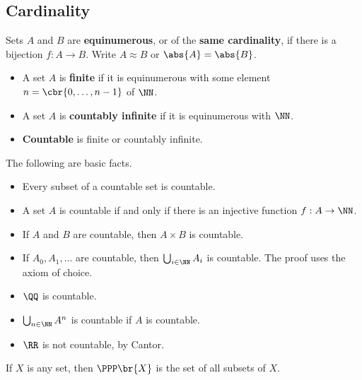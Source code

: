 \subsection{Cardinality}

\begin{definition}
Sets $ A $ and $ B $ are \textbf{equinumerous}, or of the \textbf{same cardinality}, if there is a bijection $ f : A \to B $. Write $ A \approx B $ or $ \abs{A} = \abs{B} $.
\end{definition}

\begin{definition}
\hfill
\begin{itemize}
\item A set $ A $ is \textbf{finite} if it is equinumerous with some element $ n = \cbr{0, \dots, n - 1} $ of $ \NN $.
\item A set $ A $ is \textbf{countably infinite} if it is equinumerous with $ \NN $.
\item \textbf{Countable} is finite or countably infinite.
\end{itemize}
\end{definition}

\begin{remark}
The following are basic facts.
\begin{itemize}
\item Every subset of a countable set is countable.
\item A set $ A $ is countable if and only if there is an injective function $ f : A \to \NN $.
\item If $ A $ and $ B $ are countable, then $ A \times B $ is countable.
\item If $ A_0, A_1, \dots $ are countable, then $ \bigcup_{i \in \NN} A_i $ is countable. The proof uses the axiom of choice.
\end{itemize}
\end{remark}

\begin{example*}
\hfill
\begin{itemize}
\item $ \QQ $ is countable.
\item $ \bigcup_{n \in \NN} A^n $ is countable if $ A $ is countable.
\item $ \RR $ is not countable, by Cantor.
\end{itemize}
\end{example*}

\pagebreak

If $ X $ is any set, then $ \PPP\br{X} $ is the set of all subsets of $ X $.

